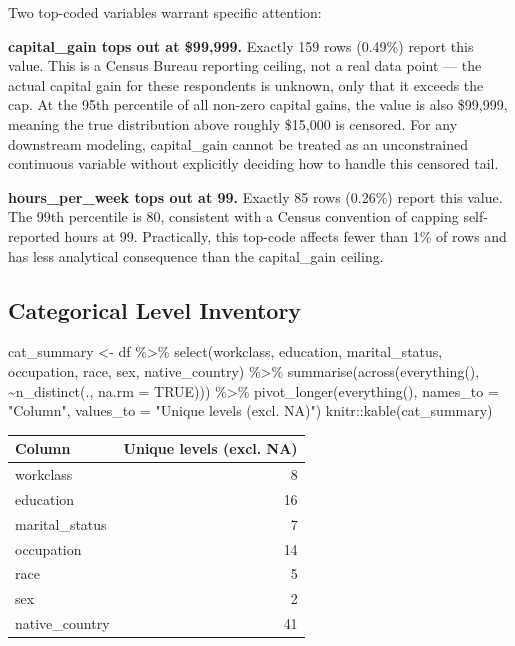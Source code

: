 \documentclass[
  letterpaper,
  DIV=11,
  numbers=noendperiod]{scrartcl}
\newenvironment{Shaded}{\begin{snugshade}}{\end{snugshade}}
\newcommand{\AttributeTok}[1]{\textcolor[rgb]{0.40,0.45,0.13}{#1}}
\newcommand{\ConstantTok}[1]{\textcolor[rgb]{0.56,0.35,0.01}{#1}}
\newcommand{\FunctionTok}[1]{\textcolor[rgb]{0.28,0.35,0.67}{#1}}
\newcommand{\NormalTok}[1]{\textcolor[rgb]{0.00,0.23,0.31}{#1}}
\newcommand{\OtherTok}[1]{\textcolor[rgb]{0.00,0.23,0.31}{#1}}
\newcommand{\SpecialCharTok}[1]{\textcolor[rgb]{0.37,0.37,0.37}{#1}}
\newcommand{\StringTok}[1]{\textcolor[rgb]{0.13,0.47,0.30}{#1}}
\begin{document}
Two top-coded variables warrant specific attention:

\textbf{capital\_gain tops out at \$99,999.} Exactly 159 rows (0.49\%)
report this value. This is a Census Bureau reporting ceiling, not a real
data point --- the actual capital gain for these respondents is unknown,
only that it exceeds the cap. At the 95th percentile of all non-zero
capital gains, the value is also \$99,999, meaning the true distribution
above roughly \$15,000 is censored. For any downstream modeling,
capital\_gain cannot be treated as an unconstrained continuous variable
without explicitly deciding how to handle this censored tail.

\textbf{hours\_per\_week tops out at 99.} Exactly 85 rows (0.26\%)
report this value. The 99th percentile is 80, consistent with a Census
convention of capping self-reported hours at 99. Practically, this
top-code affects fewer than 1\% of rows and has less analytical
consequence than the capital\_gain ceiling.

\subsection{Categorical Level
Inventory}\label{categorical-level-inventory}

\begin{Shaded}
\begin{Highlighting}[]
\NormalTok{cat\_summary }\OtherTok{\textless{}{-}}\NormalTok{ df }\SpecialCharTok{\%\textgreater{}\%}
  \FunctionTok{select}\NormalTok{(workclass, education, marital\_status, occupation, race, sex, native\_country) }\SpecialCharTok{\%\textgreater{}\%}
  \FunctionTok{summarise}\NormalTok{(}\FunctionTok{across}\NormalTok{(}\FunctionTok{everything}\NormalTok{(), }\SpecialCharTok{\textasciitilde{}}\FunctionTok{n\_distinct}\NormalTok{(., }\AttributeTok{na.rm =} \ConstantTok{TRUE}\NormalTok{))) }\SpecialCharTok{\%\textgreater{}\%}
  \FunctionTok{pivot\_longer}\NormalTok{(}\FunctionTok{everything}\NormalTok{(), }\AttributeTok{names\_to =} \StringTok{"Column"}\NormalTok{, }\AttributeTok{values\_to =} \StringTok{"Unique levels (excl. NA)"}\NormalTok{)}
\NormalTok{knitr}\SpecialCharTok{::}\FunctionTok{kable}\NormalTok{(cat\_summary)}
\end{Highlighting}
\end{Shaded}

\begin{longtable}[]{@{}lr@{}}
\toprule\noalign{}
Column & Unique levels (excl. NA) \\
\midrule\noalign{}
\endhead
\bottomrule\noalign{}
\endlastfoot
workclass & 8 \\
education & 16 \\
marital\_status & 7 \\
occupation & 14 \\
race & 5 \\
sex & 2 \\
native\_country & 41 \\
\end{longtable}
\end{document}
